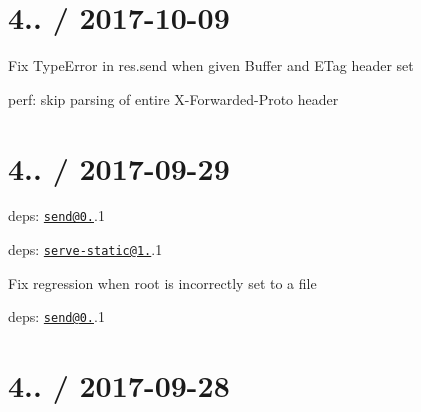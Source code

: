 \section*{4.. / 2017-\/10-\/09 }


\begin{DoxyItemize}
\item Fix {\ttfamily Type\+Error} in {\ttfamily res.\+send} when given {\ttfamily Buffer} and {\ttfamily E\+Tag} header set
\item perf\+: skip parsing of entire {\ttfamily X-\/\+Forwarded-\/\+Proto} header
\end{DoxyItemize}

\section*{4.. / 2017-\/09-\/29 }


\begin{DoxyItemize}
\item deps\+: \href{mailto:send@0.16}{\tt send@0.}.1
\item deps\+: \href{mailto:serve-static@1.13}{\tt serve-\/static@1.}.1
\begin{DoxyItemize}
\item Fix regression when {\ttfamily root} is incorrectly set to a file
\item deps\+: \href{mailto:send@0.16}{\tt send@0.}.1
\end{DoxyItemize}
\end{DoxyItemize}

\section*{4.. / 2017-\/09-\/28 }


